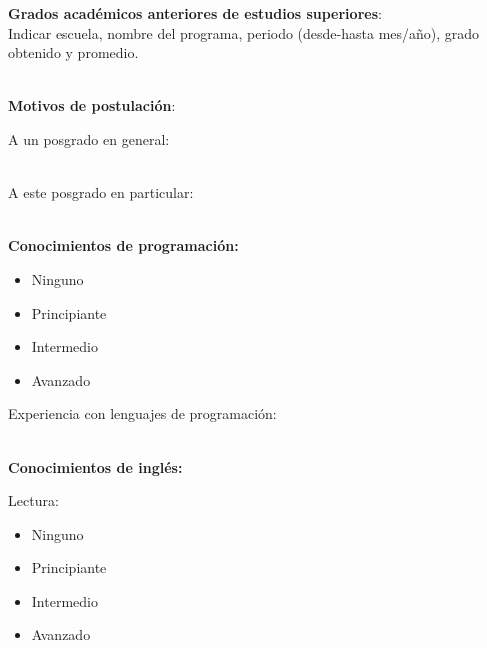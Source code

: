 \documentclass{article}
\begin{document}
\begin{Form}
{\bf Grados académicos anteriores de estudios superiores}: \\
Indicar escuela, nombre del programa, periodo (desde-hasta mes/año), grado obtenido y
promedio.
\\ \\ \TextField[name=prev,multiline=true,bordercolor=black,align=0,width=\textwidth,height=10em]{}

{\bf Motivos de postulación}: 

A un posgrado en general: \\ \\
\TextField[name=gen,multiline=true,bordercolor=black,align=0,width=\textwidth,height=15em]{}

A este posgrado en particular: \\ \\
\TextField[name=part,multiline=true,bordercolor=black,align=0,width=\textwidth,height=15em]{}

\newpage

{\bf Conocimientos de programación:}
\begin{itemize}[itemsep=-2pt]
\item[\raisebox{-4pt}{{\ChoiceMenu[radio,radiosymbol=\ding{52},name=progra]{}{=1}}}]{Ninguno}
\item[\raisebox{-4pt}{{\ChoiceMenu[radio,radiosymbol=\ding{52},name=progra]{}{=2}}}]{Principiante}
\item[\raisebox{-4pt}{{\ChoiceMenu[radio,radiosymbol=\ding{52},name=progra]{}{=3}}}]{Intermedio}
\item[\raisebox{-4pt}{{\ChoiceMenu[radio,radiosymbol=\ding{52},name=progra]{}{=4}}}]{Avanzado}
\end{itemize}

Experiencia con lenguajes de programación: \\ \\
\TextField[name=lenguajes,multiline=true,bordercolor=black,align=0,width=\textwidth,height=15em]{}

{\bf Conocimientos de inglés:}

\begin{multicols}{3}

Lectura:
\begin{itemize}[itemsep=-2pt]
\item[\raisebox{-4pt}{{\ChoiceMenu[radio,radiosymbol=\ding{52},name=il]{}{=1}}}]{Ninguno}
\item[\raisebox{-4pt}{{\ChoiceMenu[radio,radiosymbol=\ding{52},name=il]{}{=2}}}]{Principiante}
\item[\raisebox{-4pt}{{\ChoiceMenu[radio,radiosymbol=\ding{52},name=il]{}{=3}}}]{Intermedio}
\item[\raisebox{-4pt}{{\ChoiceMenu[radio,radiosymbol=\ding{52},name=il]{}{=4}}}]{Avanzado}
\end{itemize}


\end{multicols}
\end{Form}
\end{document}
